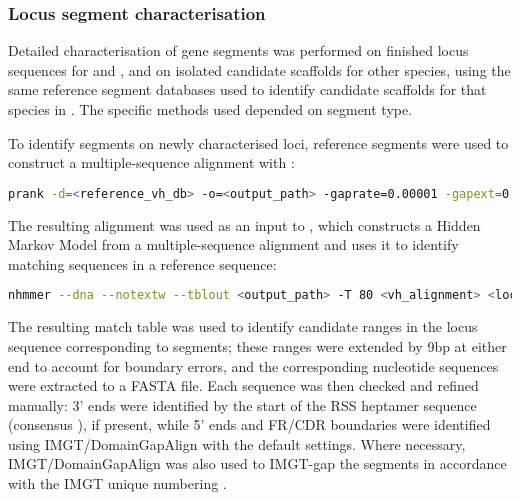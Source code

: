 \subsubsection{Locus segment characterisation}
\label{sec:methods_comp_locus_segments}


Detailed characterisation of \igh{} gene segments was performed on finished \igh{} locus sequences for \xma and \nfu, and on isolated candidate scaffolds for other species, using the same reference segment databases used to identify candidate scaffolds for that species in . %
The specific methods used depended on segment type.

\subsubsubsection{\vh}

To identify \vh segments on newly characterised loci, reference \vh segments were used to construct a multiple-sequence alignment with  \parencite{loytynoja2014prank}:

\begin{lstlisting}[language=bash]
prank -d=<reference_vh_db> -o=<output_path> -gaprate=0.00001 -gapext=0.00001 -F -termgap
\end{lstlisting}

The resulting alignment was used as an input to  \parencite{wheeler2013nhmmer,eddy2011hmm,eddy2009homology,eddy2008alignment}, which constructs a Hidden Markov Model from a multiple-sequence alignment and uses it to identify matching sequences in a reference sequence:

\begin{lstlisting}[language=bash]
nhmmer --dna --notextw --tblout <output_path> -T 80 <vh_alignment> <locus_sequence_path>
\end{lstlisting}

The resulting match table was used to identify candidate ranges in the locus sequence corresponding to \vh segments; these ranges were extended by 9bp at either end to account for boundary errors, and the corresponding nucleotide sequences were extracted to a FASTA file. Each sequence was then checked and refined manually: 3' ends were identified by the start of the RSS heptamer sequence (consensus ), if present, while 5' ends and FR/CDR boundaries were identified using IMGT/DomainGapAlign \parencite{ehrenmann2011domaingapalign} with the default settings. Where necessary, IMGT/DomainGapAlign was also used to IMGT-gap the \vh segments in accordance with the IMGT unique numbering \parencite{lefranc2003vnumbering}.

